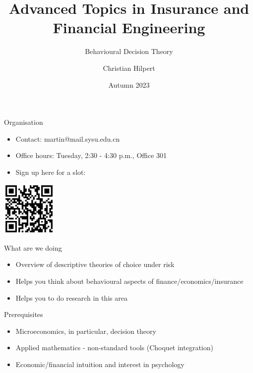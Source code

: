 





\title[Advanced Topics in Insurance and Financial Engineering]{Advanced Topics in Insurance and Financial Engineering}
\subtitle{Behavioural Decision Theory}
\author[Christian Hilpert]{Christian Hilpert}
\date[Autumn 2023]{Autumn 2023}




\begin{frame}{Organisation}
    \begin{itemize}
        \item Contact: martin@mail.sysu.edu.cn\bigskip
        \item Office hours: Tuesday, 2:30 - 4:30 p.m., Office 301\bigskip
        \item Sign up here for a slot:
    \end{itemize}
    \centering
    \includegraphics[width = 0.2\textwidth]{OfficeHour}

\end{frame}

\begin{frame}{What are we doing}
    \begin{itemize}
        \item Overview of descriptive theories of choice under risk\bigskip
        \item Helps you think about behavioural aspects of finance/economics/insurance\bigskip
        \item Helps you to do research in this area\bigskip
    \end{itemize}
\end{frame}


\begin{frame}{Prerequisites}
    \begin{itemize}
        \item Microeconomics, in particular, decision theory\bigskip
        \item Applied mathematics - non-standard tools (Choquet integration)\bigskip
        \item Economic/financial intuition and interest in psychology\bigskip
    \end{itemize}
\end{frame}


